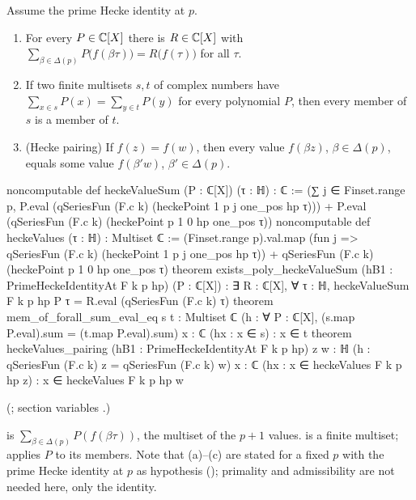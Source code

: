 \begin{theorem}\label{ch19:thm:pairing}
Assume the prime Hecke identity at $p$.
\begin{enumerate}[label=(\alph*)]
\item For every $P\in{\mathbb{C}}[X]$ there is $R\in{\mathbb{C}}[X]$ with $\sum_{\beta\in\Delta(p)}P\bigl(f(\beta\tau)\bigr)=R\bigl(f(\tau)\bigr)$ for all $\tau$.
\item If two finite multisets $s,t$ of complex numbers have $\sum_{x\in s}P(x)=\sum_{y\in t}P(y)$ for every polynomial $P$, then
  every member of $s$ is a member of $t$.
\item (Hecke pairing) If $f(z)=f(w)$, then every value $f(\beta z)$, $\beta\in\Delta(p)$, equals some value $f(\beta'w)$, $\beta'\in\Delta(p)$.
\end{enumerate}
\end{theorem}
\begin{leancode}
noncomputable def heckeValueSum (P : ℂ[X]) (τ : ℍ) : ℂ :=
  (∑ j ∈ Finset.range p, P.eval (qSeriesFun (F.c k) (heckePoint 1 p j one_pos hp τ))) +
    P.eval (qSeriesFun (F.c k) (heckePoint p 1 0 hp one_pos τ))
noncomputable def heckeValues (τ : ℍ) : Multiset ℂ :=
  (Finset.range p).val.map (fun j => qSeriesFun (F.c k) (heckePoint 1 p j one_pos hp τ)) +
    {qSeriesFun (F.c k) (heckePoint p 1 0 hp one_pos τ)}
theorem exists_poly_heckeValueSum (hB1 : PrimeHeckeIdentityAt F k p hp) (P : ℂ[X]) :
    ∃ R : ℂ[X], ∀ τ : ℍ, heckeValueSum F k p hp P τ = R.eval (qSeriesFun (F.c k) τ)
theorem mem_of_forall_sum_eval_eq {s t : Multiset ℂ}
    (h : ∀ P : ℂ[X], (s.map P.eval).sum = (t.map P.eval).sum) {x : ℂ} (hx : x ∈ s) :
    x ∈ t
theorem heckeValues_pairing (hB1 : PrimeHeckeIdentityAt F k p hp) {z w : ℍ}
    (h : qSeriesFun (F.c k) z = qSeriesFun (F.c k) w) {x : ℂ}
    (hx : x ∈ heckeValues F k p hp z) : x ∈ heckeValues F k p hp w
\end{leancode}
(; section variables .)
\begin{dictionary}
 is $\sum_{\beta\in\Delta(p)}P(f(\beta\tau))$,  the multiset of the $p+1$ values.
 is a finite multiset;  applies $P$ to its members.  Note that (a)--(c) are stated for a
fixed $p$ with the prime Hecke identity at $p$ as hypothesis (); primality and
admissibility are not needed here, only the identity.
\end{dictionary}

